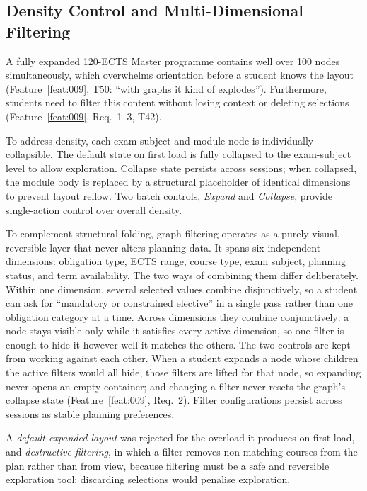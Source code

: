 \subsection{Density Control and Multi-Dimensional Filtering}
\label{sec:collapse-and-filters}

A fully expanded 120-ECTS Master programme contains well over 100 nodes simultaneously, which overwhelms orientation before a student knows the layout (Feature~\ref{feat:009}, T50: \enquote{with graphs it kind of explodes}). Furthermore, students need to filter this content without losing context or deleting selections (Feature~\ref{feat:009}, Req.~1--3, T42).

To address density, each exam subject and module node is individually collapsible. The default state on first load is fully collapsed to the exam-subject level to allow exploration. Collapse state persists across sessions; when collapsed, the module body is replaced by a structural placeholder of identical dimensions to prevent layout reflow. Two batch controls, \emph{Expand} and \emph{Collapse}, provide single-action control over overall density.

To complement structural folding, graph filtering operates as a purely visual, reversible layer that never alters planning data. It spans six independent dimensions: obligation type, ECTS range, course type, exam subject, planning status, and term availability. The two ways of combining them differ deliberately. Within one dimension, several selected values combine disjunctively, so a student can ask for \enquote{mandatory or constrained elective} in a single pass rather than one obligation category at a time. Across dimensions they combine conjunctively: a node stays visible only while it satisfies every active dimension, so one filter is enough to hide it however well it matches the others.
The two controls are kept from working against each other. When a student expands a node whose children the active filters would all hide, those filters are lifted for that node, so expanding never opens an empty container; and changing a filter never resets the graph's collapse state (Feature~\ref{feat:009}, Req.~2). Filter configurations persist across sessions as stable planning preferences.

A \emph{default-expanded layout} was rejected for the overload it produces on first load, and \emph{destructive filtering}, in which a filter removes non-matching courses from the plan rather than from view, because filtering must be a safe and reversible exploration tool; discarding selections would penalise exploration.


